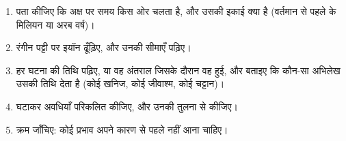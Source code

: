 \begin{method}[भूवैज्ञानिक समयरेखा पढ़ना]\label{met:g12:early-earth:timeline}
\begin{enumerate}
  \item पता कीजिए कि अक्ष पर समय किस ओर चलता है, और उसकी इकाई क्या है (वर्तमान से
        पहले के मिलियन या अरब वर्ष)।
  \item रंगीन पट्टी पर इयॉन ढूँढ़िए, और उनकी सीमाएँ पढ़िए।
  \item हर घटना की तिथि पढ़िए, या वह अंतराल जिसके दौरान वह
        हुई, और बताइए कि कौन-सा अभिलेख उसकी तिथि देता है (कोई खनिज, कोई जीवाश्म, कोई चट्टान)।
  \item घटाकर अवधियाँ परिकलित कीजिए, और उनकी तुलना  से कीजिए।
  \item क्रम जाँचिए: कोई प्रभाव अपने कारण से पहले नहीं आना चाहिए।
\end{enumerate}
\end{method}

